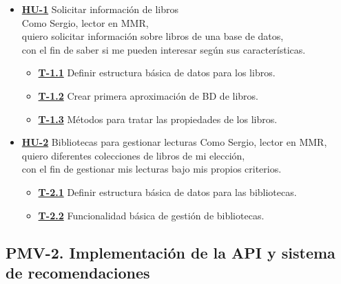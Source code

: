 \begin{itemize}
    \item \href{https://github.com/Anglepi/My-Many-Reads/issues/29}{\textbf{HU-1}} Solicitar información de libros \\
    Como Sergio, lector en MMR, \\
    quiero solicitar información sobre libros de una base de datos, \\
    con el fin de saber si me pueden interesar según sus características.
    \begin{itemize}
        \item \href{https://github.com/Anglepi/My-Many-Reads/issues/31}{\textbf{T-1.1}} Definir estructura básica de datos para los libros.
        \item \href{https://github.com/Anglepi/My-Many-Reads/issues/32}{\textbf{T-1.2}} Crear primera aproximación de BD de libros.
        \item \href{https://github.com/Anglepi/My-Many-Reads/issues/33}{\textbf{T-1.3}} Métodos para tratar las propiedades de los libros.
    \end{itemize}
    \item \href{https://github.com/Anglepi/My-Many-Reads/issues/30}{\textbf{HU-2}} Bibliotecas para gestionar lecturas
    Como Sergio, lector en MMR, \\
    quiero diferentes colecciones de libros de mi elección, \\
    con el fin de gestionar mis lecturas bajo mis propios criterios.
    \begin{itemize}
        \item \href{https://github.com/Anglepi/My-Many-Reads/issues/34}{\textbf{T-2.1}} Definir estructura básica de datos para las bibliotecas.
        \item \href{https://github.com/Anglepi/My-Many-Reads/issues/35}{\textbf{T-2.2}} Funcionalidad básica de gestión de bibliotecas.
    \end{itemize}
\end{itemize}

\subsection{PMV-2. Implementación de la API y sistema de recomendaciones}
\label{pmv2}

